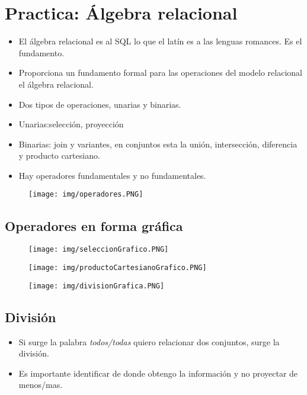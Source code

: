 
\section{Practica: Álgebra relacional}
\begin{itemize}
\item El álgebra relacional es al SQL lo que el latín es a las lenguas romances. Es el fundamento.
\item Proporciona un fundamento formal para las operaciones del modelo relacional el álgebra relacional.
\item Dos tipos de operaciones, unarias y binarias.
\item Unarias:selección, proyección
\item Binarias: join y variantes, en conjuntos esta la unión, intersección, diferencia y producto cartesiano.
\item Hay operadores fundamentales y no fundamentales.
\end{itemize}


\begin{figure}[!htb]
    \centering
    \texttt{[image: img/operadores.PNG]}
\end{figure}

\subsection*{Operadores en forma gráfica}

\begin{figure}[!htb]
    \centering
    \texttt{[image: img/seleccionGrafico.PNG]}
\end{figure}


\begin{figure}[!htb]
    \centering
    \texttt{[image: img/productoCartesianoGrafico.PNG]}
\end{figure}

\begin{figure}[!htb]
    \centering
    \texttt{[image: img/divisionGrafica.PNG]}
\end{figure}

\subsection*{División}

\begin{itemize}
\item Si surge la palabra \emph{todos/todas} quiero relacionar dos conjuntos, surge la división.
\item Es importante identificar de donde obtengo la información y no proyectar de menos/mas.
\end{itemize}

